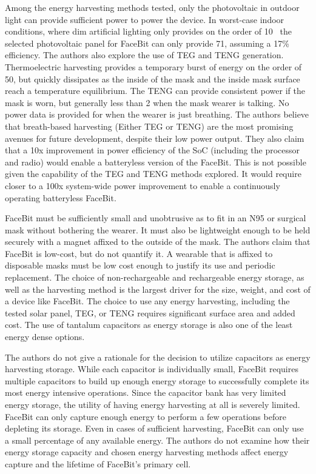 Among the energy harvesting methods tested, only the photovoltaic in outdoor light can provide sufficient power to power the device.
In worst-case indoor conditions, where dim artificial lighting only provides on the order of 10\ssi[per-mode=symbol]{\micro\watt\per\centi\meter\squared}~\cite{yervaGrafting12}
the selected photovoltaic panel for FaceBit can only provide 71\ssi{\micro\watt}, assuming a 17\% efficiency.
The authors also explore the use of TEG and TENG generation.
Thermoelectric harvesting provides a temporary burst of energy on the order of 50\ssi{\micro\watt}, but quickly dissipates as the inside of the mask and the inside mask surface reach a temperature equilibrium. 
The TENG can provide consistent power if the mask is worn, but generally less than 2\ssi{\micro\watt} when the mask wearer is talking. No power data is provided for when the wearer is just breathing.
The authors believe that breath-based harvesting (Either TEG or TENG) are the most promising avenues for future development, despite their low power output.
They also claim that a 10x improvement in power efficiency of the SoC (including the processor and radio) would enable a batteryless version of the FaceBit.
This is not possible given the capability of the TEG and TENG methods explored. It would require closer to a 100x system-wide power improvement to enable a continuously operating batteryless FaceBit.

FaceBit must be sufficiently small and unobtrusive as to fit in an N95 or surgical mask without bothering the wearer.
It must also be lightweight enough to be held securely with a magnet affixed to the outside of the mask.
The authors claim that FaceBit is low-cost, but do not quantify it. 
A wearable that is affixed to disposable masks must be low cost enough to justify its use and periodic replacement.
The choice of non-rechargeable and rechargeable energy storage, as well as the harvesting method is the largest driver for the size, weight, and cost of a device like FaceBit.
The choice to use any energy harvesting, including the tested solar panel, TEG, or TENG requires significant surface area and added cost. 
The use of tantalum capacitors as energy storage is also one of the least energy dense options. 

The authors do not give a rationale for the decision to utilize capacitors as energy harvesting storage.
While each capacitor is individually small, FaceBit requires multiple capacitors to build up enough energy storage to successfully complete its most energy intensive operations.
Since the capacitor bank has very limited energy storage, the utility of having energy harvesting at all is severely limited.
FaceBit can only capture enough energy to perform a few operations before depleting its storage. Even in cases of sufficient harvesting, FaceBit can only use a small percentage of any available energy.
The authors do not examine how their energy storage capacity and chosen energy harvesting methods affect energy capture and the lifetime of FaceBit's primary cell.

